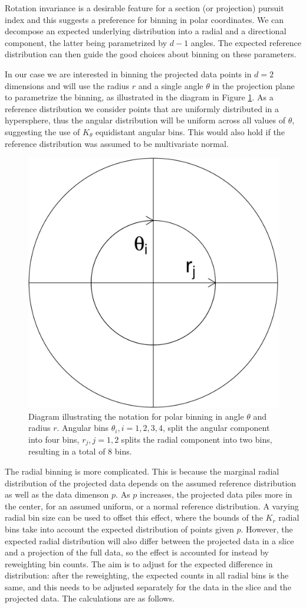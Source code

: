\documentclass[]{interact}
\theoremstyle{plain}%
\theoremstyle{definition}
\theoremstyle{remark}
\begin{document}
Rotation invariance is a desirable feature for a section (or projection)
pursuit index and this suggests a preference for binning in polar
coordinates. We can decompose an expected underlying distribution into a
radial and a directional component, the latter being parametrized by
\(d-1\) angles. The expected reference distribution can then guide the
good choices about binning on these parameters.

In our case we are interested in binning the projected data points in
\(d=2\) dimensions and will use the radius \(r\) and a single angle
\(\theta\) in the projection plane to parametrize the binning, as
illustrated in the diagram in Figure \ref{fig:sketch}. As a reference
distribution we consider points that are uniformly distributed in a
hypersphere, thus the angular distribution will be uniform across all
values of \(\theta\), suggesting the use of \(K_{\theta}\) equidistant
angular bins. This would also hold if the reference distribution was
assumed to be multivariate normal.

\begin{figure}

{\centering \includegraphics[width=0.3\linewidth]{section_pursuit_files/figure-latex/sketch-1} 

}

\caption{Diagram illustrating the notation for polar binning in angle $\theta$ and radius $r$. Angular bins $\theta_i, i=1, 2, 3, 4$, split the angular component into four bins, $r_j, j=1, 2$ splits the radial component into two bins, resulting in a total of 8 bins.}\label{fig:sketch}
\end{figure}

The radial binning is more complicated. This is because the marginal
radial distribution of the projected data depends on the assumed
reference distribution as well as the data dimenson \(p\). As \(p\)
increases, the projected data piles more in the center, for an assumed
uniform, or a normal reference distribution. A varying radial bin size
can be used to offset this effect, where the bounds of the \(K_r\)
radial bins take into account the expected distribution of points given
\(p\). However, the expected radial distribution will also differ
between the projected data in a slice and a projection of the full data,
so the effect is accounted for instead by reweighting bin counts. The
aim is to adjust for the expected difference in distribution: after the
reweighting, the expected counts in all radial bins is the same, and
this needs to be adjusted separately for the data in the slice and the
projected data. The calculations are as follows.
\end{document}
